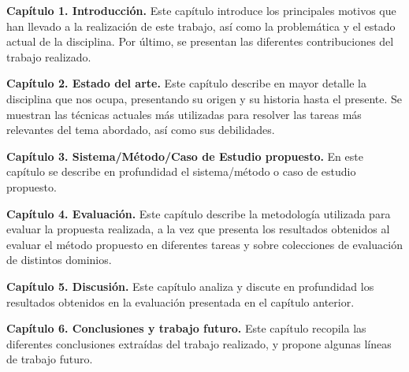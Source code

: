 \begin{description}

    \item \textbf{Capítulo 1. Introducción.} Este capítulo introduce los principales motivos que han llevado a la realización de este trabajo, así como la problemática y el estado actual de la disciplina. Por último, se presentan las diferentes contribuciones del trabajo realizado.
    \item \textbf{Capítulo 2. Estado del arte.} Este capítulo describe en mayor detalle la disciplina que nos ocupa, presentando su origen y su historia hasta el presente. Se muestran las técnicas actuales más utilizadas para resolver las tareas más relevantes del tema abordado, así como sus debilidades.
    \item \textbf{Capítulo 3. Sistema/Método/Caso de Estudio propuesto.}  En este capítulo se describe en profundidad el sistema/método o caso de estudio propuesto.
    \item \textbf{Capítulo 4. Evaluación.} Este capítulo describe la metodología utilizada para evaluar la propuesta realizada, a la vez que presenta los resultados obtenidos al evaluar el método propuesto en diferentes tareas y sobre colecciones de evaluación de distintos dominios.
    \item \textbf{Capítulo 5. Discusión.} Este capítulo analiza y discute en profundidad los resultados obtenidos en la evaluación presentada en el capítulo anterior.
    \item \textbf{Capítulo 6. Conclusiones y trabajo futuro.} Este capítulo recopila las diferentes conclusiones extraídas del trabajo realizado, y propone algunas líneas de trabajo futuro.
\end{description}